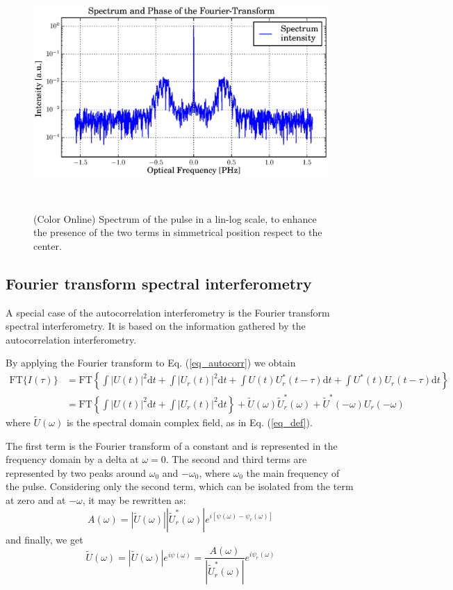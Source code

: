 \documentclass[12pt,a4paper,twoside]{article}
\begin{document}
\begin{figure}[ht]
	\centering
	\includegraphics[scale=.9]{data/spectrum_linlog.eps}
	\label{fig_spectrum}
	\caption{(Color Online) Spectrum of the pulse in a lin-log scale, to enhance the presence of the two terms in simmetrical position respect to the center.}
	\
\end{figure}

\subsection{Fourier transform spectral interferometry}
A special case of the autocorrelation interferometry is the Fourier transform spectral interferometry.
It is based on the information gathered by the autocorrelation interferometry.

By applying the Fourier transform to Eq. (\ref{eq_autocorr}) we obtain
\begin{align}
	\mathrm{FT} \lbrace I(\tau) \rbrace
	&= \mathrm{FT} 	\left\lbrace	\int|U(t)|^2\mathrm{d}t + \int|U_r(t)|^2\mathrm{d}t +
							\int U(t)U_r^*(t-\tau)\mathrm{d}t + \int U^*(t)U_r(t-\tau)\mathrm{d}t
					\right\rbrace \nonumber\\
	&= \mathrm{FT}	\left\lbrace \int|U(t)|^2\mathrm{d}t + \int|U_r(t)|^2\mathrm{d}t \right\rbrace
	+ \tilde{U}(\omega)\tilde{U}_r^*(\omega)
	+ \tilde{U}^*(-\omega)U_r(-\omega)
\end{align}
where $\tilde{U}(\omega)$ is the spectral domain complex field, as in Eq. (\ref{eq_def}).

The first term is the Fourier transform of a constant and is represented in the frequency domain by a delta at $\omega = 0$.
The second and third terms are represented by two peaks around $\omega_0$ and $-\omega_0$, where $\omega_0$ the main frequency of the pulse.
Considering only the second term, which can be isolated from the term at zero and at $-\omega$, it may be rewritten as:
\begin{equation}
	A(\omega)=|\tilde{U}(\omega)||\tilde{U}_r^*(\omega)|e^{i[\psi(\omega)-\psi_r(\omega)]}
\end{equation}
and finally, we get
\begin{equation}
	\tilde{U}(\omega) = |\tilde{U}(\omega)|e^{i\psi(\omega)} = \frac{A(\omega)}{|\tilde{U}_r^*(\omega)|}e^{i\psi_r(\omega)}
\end{equation}
\end{document}
